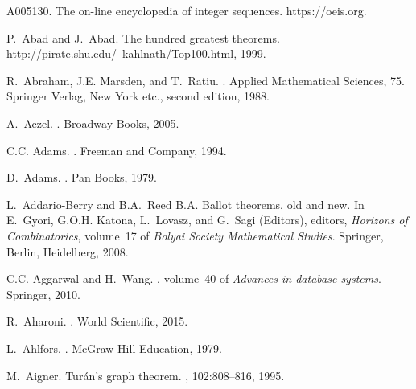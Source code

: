 \documentclass[12pt]{amsart}
\def\chapter#1{ \vspace{2mm} \begin{center} \fcolorbox{green1}{green1}{ \parbox{16.2cm}{{\Large {\bf #1}}}} \vspace{2mm} \end{center} }
\begin{document}
\printindex

\chapter{Bibliography}


\begin{thebibliography}{100}

A005130.
\newblock The on-line encyclopedia of integer sequences.
\newblock https://oeis.org.

P.~Abad and J.~Abad.
\newblock The hundred greatest theorems.
\newblock {\\}http://pirate.shu.edu/~kahlnath/Top100.html, 1999.

R.~Abraham, J.E. Marsden, and T.~Ratiu.
.
\newblock Applied Mathematical Sciences, 75. Springer Verlag, New York etc.,
  second edition, 1988.

A.~Aczel.
.
\newblock Broadway Books, 2005.

C.C. Adams.
.
\newblock Freeman and Company, 1994.

D.~Adams.
.
\newblock Pan Books, 1979.

L.~Addario-Berry and B.A.~Reed B.A.
\newblock Ballot theorems, old and new.
\newblock In E.~Gyori, G.O.H. Katona, L.~Lovasz, and G.~Sagi (Editors),
  editors, {\em Horizons of Combinatorics}, volume~17 of {\em Bolyai Society
  Mathematical Studies}. Springer, Berlin, Heidelberg, 2008.

C.C. Aggarwal and H.~Wang.
, volume~40 of {\em Advances in
  database systems}.
\newblock Springer, 2010.

R.~Aharoni.
.
\newblock World Scientific, 2015.

L.~Ahlfors.
.
\newblock McGraw-Hill Education, 1979.

M.~Aigner.
\newblock Tur\'an's graph theorem.
, 102:808--816, 1995.


\end{thebibliography}
\end{document}
